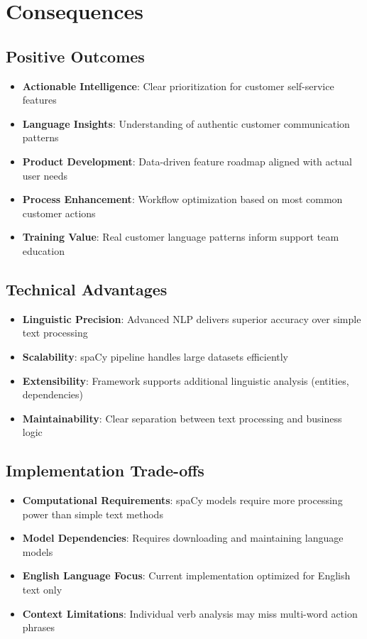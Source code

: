 \documentclass[11pt]{article}
\begin{document}
\section{Consequences}

\subsection{Positive Outcomes}
\begin{itemize}
\item \textbf{Actionable Intelligence}: Clear prioritization for customer self-service features
\item \textbf{Language Insights}: Understanding of authentic customer communication patterns
\item \textbf{Product Development}: Data-driven feature roadmap aligned with actual user needs
\item \textbf{Process Enhancement}: Workflow optimization based on most common customer actions
\item \textbf{Training Value}: Real customer language patterns inform support team education
\end{itemize}

\subsection{Technical Advantages}
\begin{itemize}
\item \textbf{Linguistic Precision}: Advanced NLP delivers superior accuracy over simple text processing
\item \textbf{Scalability}: spaCy pipeline handles large datasets efficiently
\item \textbf{Extensibility}: Framework supports additional linguistic analysis (entities, dependencies)
\item \textbf{Maintainability}: Clear separation between text processing and business logic
\end{itemize}

\subsection{Implementation Trade-offs}
\begin{itemize}
\item \textbf{Computational Requirements}: spaCy models require more processing power than simple text methods
\item \textbf{Model Dependencies}: Requires downloading and maintaining language models
\item \textbf{English Language Focus}: Current implementation optimized for English text only
\item \textbf{Context Limitations}: Individual verb analysis may miss multi-word action phrases
\end{itemize}
\end{document}
